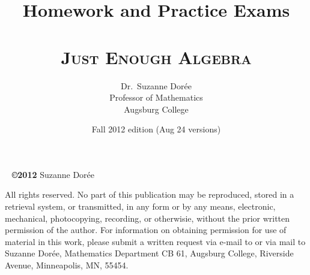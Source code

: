 \documentclass[11pt]{book}
\begin{document}

\title{Homework and Practice Exams\\ ~ \\ \textsc{Just Enough Algebra} }
\author{Dr.\ Suzanne Dor\'ee \\ Professor of Mathematics\\Augsburg College}
\date{Fall 2012 edition (Aug 24 versions)}
\maketitle

\newpage

~\vfill 
\noindent \textbf{\copyright 2012} Suzanne Dor\'ee  

\noindent All rights reserved.  No part of this publication may be reproduced, stored in a retrieval system, or transmitted, in any form or by any means, electronic, mechanical, photocopying, recording, or otherwisie, without the prior written permission of the author.  For information on obtaining permission for use of material in this work, please submit a written request via e-mail to  or via mail to Suzanne Dor\'ee, Mathematics Department CB 61, Augsburg College, Riverside Avenue, Minneapolis, MN, 55454. 

\tableofcontents

 
       
       
       
       
      
% 
      
 
       
       
       
       
       
%
      
 
       
       
             
  
       
% 
      
     
      
      
      
      
      
% 
      
\end{document}
